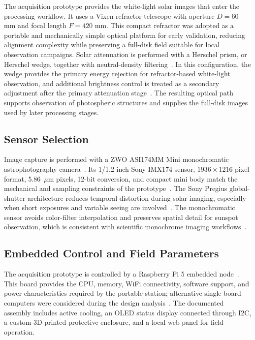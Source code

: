 \documentclass[conference,a4paper]{IEEEtran}
\begin{document}
The acquisition prototype provides the white-light solar images that enter the processing workflow. It uses a Vixen refractor telescope with aperture $D=60$ mm and focal length $F=420$ mm. This compact refractor was adopted as a portable and mechanically simple optical platform for early validation, reducing alignment complexity while preserving a full-disk field suitable for local observation campaigns. Solar attenuation is performed with a Herschel prism, or Herschel wedge, together with neutral-density filtering~\cite{luntWhiteLightWedges2026}. In this configuration, the wedge provides the primary energy rejection for refractor-based white-light observation, and additional brightness control is treated as a secondary adjustment after the primary attenuation stage~\cite{luntWhiteLightWedges2026,baaderHerschelUsage2026,luntPolarizerWedge2026}. The resulting optical path supports observation of photospheric structures and supplies the full-disk images used by later processing stages.


\subsection{Sensor Selection}

Image capture is performed with a ZWO ASI174MM Mini monochromatic astrophotography camera~\cite{zwoASI174Manual2025}. Its 1/1.2-inch Sony IMX174 sensor, $1936\times1216$ pixel format, 5.86~$\mu$m pixels, 12-bit conversion, and compact mini body match the mechanical and sampling constraints of the prototype~\cite{zwoASI174Manual2025,zwoGuideCameras2025}. The Sony Pregius global-shutter architecture reduces temporal distortion during solar imaging, especially when short exposures and variable seeing are involved~\cite{sonyPregiusGlobalShutter}. The monochromatic sensor avoids color-filter interpolation and preserves spatial detail for sunspot observation, which is consistent with scientific monochrome imaging workflows~\cite{janesick2001scientific,fossum1997cmos}.


\subsection{Embedded Control and Field Parameters}

The acquisition prototype is controlled by a Raspberry Pi 5 embedded node~\cite{raspberryPi5Docs2026}. This board provides the CPU, memory, WiFi connectivity, software support, and power characteristics required by the portable station; alternative single-board computers were considered during the design analysis~\cite{raspberryPi5Docs2026,jetsonOrinNanoGuide2026,orangePi5Plus2026,rock5bDocs2026}. The documented assembly includes active cooling, an OLED status display connected through I2C, a custom 3D-printed protective enclosure, and a local web panel for field operation.
\end{document}
